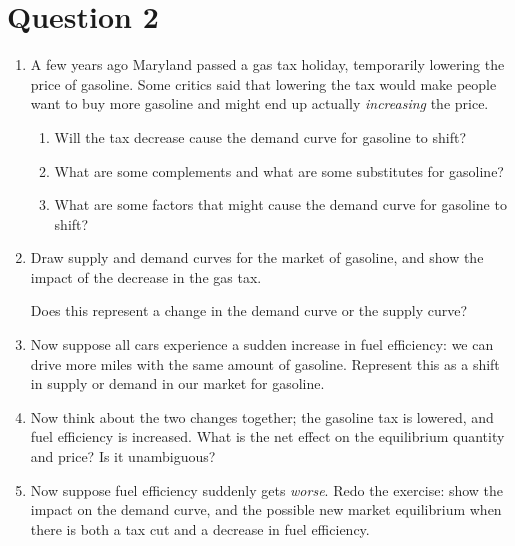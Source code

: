 \documentclass[12pt]{article}
\begin{document}
\section*{Question 2}
\begin{enumerate}

\item A few years ago Maryland passed a gas tax holiday, temporarily lowering the price of gasoline. Some critics said that lowering the tax would make people want to buy more gasoline and might end up actually \textit{increasing} the price.

\begin{enumerate}
    \item Will the tax decrease cause the demand curve for gasoline to shift?
    \item What are some complements and what are some substitutes for gasoline?
    \item What are some factors that might cause the demand curve for gasoline to shift?
\end{enumerate}

\item Draw supply and demand curves for the market of gasoline, and show the impact of the decrease in the gas tax.

\medskip

Does this represent a change in the demand curve or the supply curve?

\item Now suppose all cars experience a sudden increase in fuel efficiency: we can drive more miles with the same amount of gasoline. Represent this as a shift in supply or demand in our market for gasoline.

\item Now think about the two changes together; the gasoline tax is lowered, and fuel efficiency is increased. What is the net effect on the equilibrium quantity and price? Is it unambiguous?

\item Now suppose fuel efficiency suddenly gets \textit{worse}. Redo the exercise: show the impact on the demand curve, and the possible new market equilibrium when there is both a tax cut and a decrease in fuel efficiency.

\end{enumerate}
\end{document}
